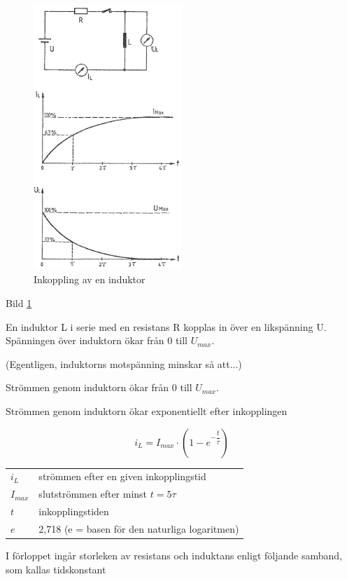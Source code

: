 \begin{figure}
\includegraphics[width=0.5\textwidth]{images/bild_2_3-10.png}
\caption{Inkoppling av en induktor}
\label{fig:BildII3-10}
\end{figure}

Bild \ref{fig:BildII3-10}

En induktor L i serie med en resistans R kopplas in över en likspänning U.
Spänningen över induktorn ökar från 0 till \(U_{max}\).

(Egentligen, induktorns motspänning minskar så att...)

Strömmen genom induktorn ökar från 0 till \(U_{max}\).

Strömmen genom induktorn ökar exponentiellt efter inkopplingen

\[i_L = I_{max} \cdot (1-e^{-\dfrac{t}{\tau}} )\]

\begin{tabular}{lp{}}
  \(i_L\) &  strömmen efter en given inkopplingstid \\
  \(I_{max}\) & slutströmmen efter minst \(t = 5\tau\) \\
  \(t\) & inkopplingstiden \\
  \(e\) & 2,718 (e = basen för den naturliga logaritmen) \\
\end{tabular}

I förloppet ingår storleken av resistans och induktans enligt följande samband,
som kallas tidskonstant

